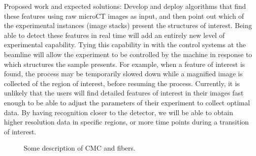 Proposed work and expected solutions: Develop and deploy algorithms that find these features using raw microCT images as input, and then point out which of the experimental instances (image stacks) present the structures of interest. Being able to detect these features in real time will add an entirely new level of experimental capability. Tying this capability in with the control systems at the beamline will allow the experiment to be controlled by the machine in response to which structures the sample presents. For example, when a feature of interest is found, the process may be temporarily slowed down while a magnified image is collected of the region of interest, before resuming the process. Currently, it is unlikely that the users will find detailed features of interest in their images fast enough to be able to adjust the parameters of their experiment to collect optimal data. By having recognition closer to the detector, we will be able to obtain higher resolution data in specific regions, or more time points during a transition of interest.


\cite{IEEEBigData:2014}


\begin{figure}[!t]
\centering
{}
{}
\caption{Some description of CMC and fibers.}
\label{fig:pycbir}
\end{figure}
